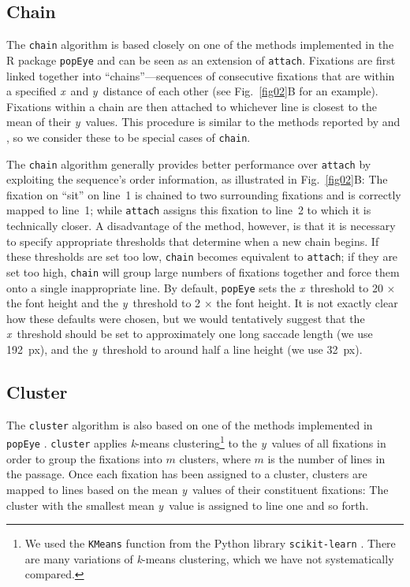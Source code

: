 \documentclass[doc,biblatex]{apa7}
\begin{document}
\subsection{Chain}

The \texttt{chain} algorithm is based closely on one of the methods implemented in the R package \texttt{popEye} \parencite{Schroeder:0000} and can be seen as an extension of \texttt{attach}. Fixations are first linked together into ``chains''---sequences of consecutive fixations that are within a specified \textit{x}~and \textit{y}~distance of each other (see Fig.~\ref{fig02}B for an example). Fixations within a chain are then attached to whichever line is closest to the mean of their \textit{y}~values. This procedure is similar to the methods reported by \textcite{Hyrskykari:2006} and \textcite{Mishra:2012}, so we consider these to be special cases of \texttt{chain}.

The \texttt{chain} algorithm generally provides better performance over \texttt{attach} by exploiting the sequence's order information, as illustrated in Fig.~\ref{fig02}B: The fixation on ``sit'' on line~1 is chained to two surrounding fixations and is correctly mapped to line~1; while \texttt{attach} assigns this fixation to line~2 to which it is technically closer. A disadvantage of the method, however, is that it is necessary to specify appropriate thresholds that determine when a new chain begins. If these thresholds are set too low, \texttt{chain} becomes equivalent to \texttt{attach}; if they are set too high, \texttt{chain} will group large numbers of fixations together and force them onto a single inappropriate line. By default, \texttt{popEye} sets the \textit{x}~threshold to 20 $\times$ the font height and the \textit{y}~threshold to 2 $\times$ the font height. It is not exactly clear how these defaults were chosen, but we would tentatively suggest that the \textit{x}~threshold should be set to approximately one long saccade length (we use 192~px), and the \textit{y}~threshold to around half a line height (we use 32~px).

\subsection{Cluster}

The \texttt{cluster} algorithm is also based on one of the methods implemented in \texttt{popEye} \parencite{Schroeder:0000}. \texttt{cluster} applies \textit{k}-means clustering\footnote{We used the \texttt{KMeans} function from the Python library \texttt{scikit-learn} \parencite{scikit-learn}. There are many variations of \textit{k}-means clustering, which we have not systematically compared.} to the \textit{y}~values of all fixations in order to group the fixations into $m$ clusters, where $m$ is the number of lines in the passage. Once each fixation has been assigned to a cluster, clusters are mapped to lines based on the mean \textit{y}~values of their constituent fixations: The cluster with the smallest mean \textit{y}~value is assigned to line one and so forth.
\end{document}
